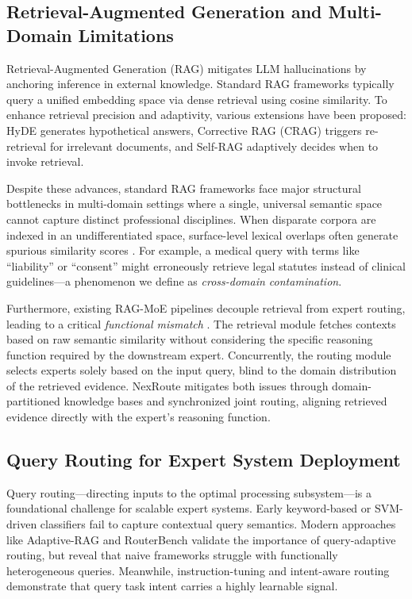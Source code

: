 \documentclass[a4paper,fleql]{cas-sc}
\begin{document}
\subsection{Retrieval-Augmented Generation and Multi-Domain Limitations}
Retrieval-Augmented Generation (RAG) \citep{lewis2020rag} mitigates LLM hallucinations by anchoring inference in external knowledge. Standard RAG frameworks typically query a unified embedding space via dense retrieval \citep{karpukhin2020dense} using cosine similarity. To enhance retrieval precision and adaptivity, various extensions have been proposed: HyDE \citep{gao2023hyde} generates hypothetical answers, Corrective RAG (CRAG) \citep{yan2024crag} triggers re-retrieval for irrelevant documents, and Self-RAG \citep{asai2023selfrag} adaptively decides when to invoke retrieval.

Despite these advances, standard RAG frameworks face major structural bottlenecks in multi-domain settings where a single, universal semantic space cannot capture distinct professional disciplines. When disparate corpora are indexed in an undifferentiated space, surface-level lexical overlaps often generate spurious similarity scores \citep{wang2024multilingual}. For example, a medical query with terms like ``liability'' or ``consent'' might erroneously retrieve legal statutes instead of clinical guidelines—a phenomenon we define as \emph{cross-domain contamination}.

Furthermore, existing RAG-MoE pipelines \citep{jeong2024adaptiverag, dou2024loramoe} decouple retrieval from expert routing, leading to a critical \emph{functional mismatch} \citep{hu2024routerbench}. The retrieval module fetches contexts based on raw semantic similarity without considering the specific reasoning function required by the downstream expert. Concurrently, the routing module selects experts solely based on the input query, blind to the domain distribution of the retrieved evidence. NexRoute mitigates both issues through domain-partitioned knowledge bases and synchronized joint routing, aligning retrieved evidence directly with the expert's reasoning function.

\subsection{Query Routing for Expert System Deployment}
Query routing—directing inputs to the optimal processing subsystem—is a foundational challenge for scalable expert systems. Early keyword-based or SVM-driven classifiers \citep{robertson2009tfidf, cortes1995svm} fail to capture contextual query semantics. Modern approaches like Adaptive-RAG \citep{jeong2024adaptiverag} and RouterBench \citep{hu2024routerbench} validate the importance of query-adaptive routing, but reveal that naive frameworks struggle with functionally heterogeneous queries. Meanwhile, instruction-tuning \citep{wei2022finetuned} and intent-aware routing \citep{patil2023gorilla} demonstrate that query task intent carries a highly learnable signal.
\end{document}

